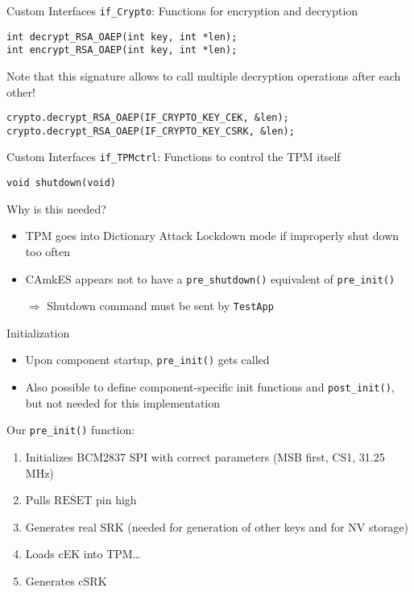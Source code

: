 \begin{frame}[fragile]{Custom Interfaces}
\texttt{if\_Crypto}: Functions for encryption and decryption

\begin{verbatim}
int decrypt_RSA_OAEP(int key, int *len);
int encrypt_RSA_OAEP(int key, int *len);
\end{verbatim}

Note that this signature allows to call multiple decryption operations after each other!

\begin{verbatim}
crypto.decrypt_RSA_OAEP(IF_CRYPTO_KEY_CEK, &len);
crypto.decrypt_RSA_OAEP(IF_CRYPTO_KEY_CSRK, &len);
\end{verbatim}
\end{frame}

\begin{frame}[fragile]{Custom Interfaces}
\texttt{if\_TPMctrl}: Functions to control the TPM itself

\begin{verbatim}
void shutdown(void)
\end{verbatim}

Why is this needed?

\begin{itemize}
\item TPM goes into Dictionary Attack Lockdown mode if improperly shut down too often
\item CAmkES appears not to have a \texttt{pre\_shutdown()} equivalent of \texttt{pre\_init()}
\item[$\Rightarrow$] Shutdown command must be sent by \texttt{TestApp}
\end{itemize}
\end{frame}

\begin{frame}{Initialization}
\begin{itemize}
\item Upon component startup, \texttt{pre\_init()} gets called
\item Also possible to define component-specific init functions and \texttt{post\_init()}, but not needed for this implementation
\end{itemize}

Our \texttt{pre\_init()} function:

\begin{enumerate}
\item Initializes BCM2837 SPI with correct parameters (MSB first, CS1, 31.25 MHz)
\item Pulls $\overline{\mbox{RESET}}$ pin high
\item Generates real SRK (needed for generation of other keys and for NV storage)
\item Loads cEK into TPM\ldots
\item Generates cSRK
\end{enumerate}
\end{frame}

